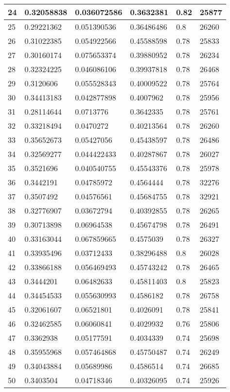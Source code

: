 \begin{longtable}{|l|l|l|l|l|l|}
24 & 0.32058838 & 0.036072586 & 0.3632381 & 0.82 & 25877 \\ \hline 
25 & 0.29221362 & 0.051390536 & 0.36486486 & 0.8 & 26260 \\ \hline 
26 & 0.31022385 & 0.054922566 & 0.45588598 & 0.78 & 25833 \\ \hline 
27 & 0.30160174 & 0.075653374 & 0.39880952 & 0.78 & 26234 \\ \hline 
28 & 0.32324225 & 0.046086106 & 0.39937818 & 0.78 & 26468 \\ \hline 
29 & 0.3120606 & 0.055528343 & 0.40009522 & 0.78 & 25764 \\ \hline 
30 & 0.34413183 & 0.042877898 & 0.4007962 & 0.78 & 25956 \\ \hline 
31 & 0.28114644 & 0.0713776 & 0.3642335 & 0.78 & 25761 \\ \hline 
32 & 0.33218494 & 0.0470272 & 0.40213564 & 0.78 & 26260 \\ \hline 
33 & 0.35652673 & 0.05427056 & 0.45438597 & 0.78 & 26486 \\ \hline 
34 & 0.32569277 & 0.044422433 & 0.40287867 & 0.78 & 26027 \\ \hline 
35 & 0.3521696 & 0.040540755 & 0.45543376 & 0.78 & 25978 \\ \hline 
36 & 0.3442191 & 0.04785972 & 0.4564444 & 0.78 & 32276 \\ \hline 
37 & 0.3507492 & 0.04576561 & 0.45684755 & 0.78 & 32921 \\ \hline 
38 & 0.32776907 & 0.03672794 & 0.40392855 & 0.78 & 26265 \\ \hline 
39 & 0.30713898 & 0.06964538 & 0.45674798 & 0.78 & 26491 \\ \hline 
40 & 0.33163044 & 0.067859665 & 0.4575039 & 0.78 & 26327 \\ \hline 
41 & 0.33935496 & 0.03712433 & 0.38296488 & 0.8 & 26028 \\ \hline 
42 & 0.33866188 & 0.056469493 & 0.45743242 & 0.78 & 26465 \\ \hline 
43 & 0.3444201 & 0.06482633 & 0.45811403 & 0.8 & 25823 \\ \hline 
44 & 0.34454533 & 0.055630993 & 0.4586182 & 0.78 & 26758 \\ \hline 
45 & 0.32061607 & 0.06521801 & 0.4026091 & 0.78 & 25841 \\ \hline 
46 & 0.32462585 & 0.06060841 & 0.4029932 & 0.76 & 25806 \\ \hline 
47 & 0.3362938 & 0.05177591 & 0.4034339 & 0.74 & 25698 \\ \hline 
48 & 0.35955968 & 0.057464868 & 0.45750487 & 0.74 & 26249 \\ \hline 
49 & 0.34043884 & 0.05689986 & 0.4586514 & 0.74 & 26685 \\ \hline 
50 & 0.3403504 & 0.04718346 & 0.40326095 & 0.74 & 25926 \\ \hline 
\end{longtable}